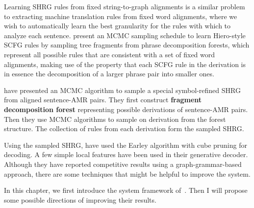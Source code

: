Learning SHRG rules 
from fixed string-to-graph alignments is a similar problem to extracting machine translation rules from fixed word
alignments, where we wish to automatically learn the best granularity for the rules with which to analyze each
sentence.  present an MCMC sampling schedule to learn Hiero-style SCFG rules \cite{ChiangCL} by sampling 
tree fragments from phrase decomposition forests, which represent all possible
rules that are consistent with a set of fixed word alignments, making use of the property that each SCFG rule in the 
derivation is in essence the 
decomposition of a larger phrase pair into smaller ones.


 have presented an MCMC algorithm to sample a special symbol-refined SHRG from aligned sentence-AMR pairs. They first construct {\bf fragment decomposition forest} representing possible derivations
of sentence-AMR pairs. Then they use MCMC algorithms to sample on derivation from the forest structure. The collection of rules from each derivation form the sampled SHRG. 


Using the sampled SHRG,  have used the Earley algorithm with cube pruning for decoding. A few simple local features have been used 
in their generative decoder. Although they have reported competitive results using a graph-grammar-based approach, there are some techniques that might be helpful to improve the system.


In this chapter, we first introduce the system framework of~.
Then I will propose some possible directions of improving their results. 
